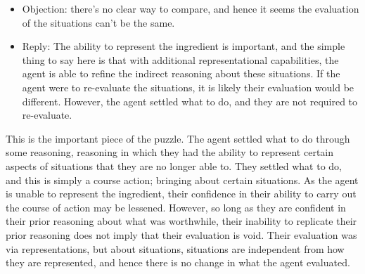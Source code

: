 \documentclass[10pt]{article}
\begin{document}
\begin{itemize}
\item Objection: there's no clear way to compare, and hence it seems the evaluation of the situations can't be the same.
\item Reply: The ability to represent the ingredient is important, and the simple thing to say here is that with additional representational capabilities, the agent is able to refine the indirect reasoning about these situations.
  If the agent were to re-evaluate the situations, it is likely their evaluation would be different.
  However, the agent settled what to do, and they are not required to re-evaluate.
\end{itemize}


This is the important piece of the puzzle.
The agent settled what to do through some reasoning, reasoning in which they had the ability to represent certain aspects of situations that they are no longer able to.
They settled what to do, and this is simply a course action; bringing about certain situations.
As the agent is unable to represent the ingredient, their confidence in their ability to carry out the course of action may be lessened.
However, so long as they are confident in their prior reasoning about what was worthwhile, their inability to replicate their prior reasoning does not imply that their evaluation is void.
Their evaluation was via representations, but about situations, situations are independent from how they are represented, and hence there is no change in what the agent evaluated.

\end{document}
